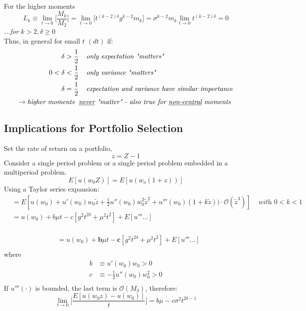 \documentclass[
14pt,notheorems,hyperref={pdfauthor=whatever}
]{beamer}
\begin{document}
\begin{frame}
For the higher moments\\
\[L_k \equiv \lim_{t \to 0}\Bigg[\frac{M_k}{M_2}\Bigg] = \lim_{t \to 0}\Bigg[t^{(k-2)\delta} g^{k-2}m_k\Bigg] = \sigma^{k-2} m_k \lim_{t \to 0} t^{(k-2)\delta}=0\]
\textit{...for $k>2, \delta \geq 0$}\\
\hfill\break
Thus, in general for small $t$ $(dt)$ if:
\begin{align*}
    \delta>\frac{1}{2}& \;\;\;\; \textit{only expectation "matters"}\\
    0<\delta<\frac{1}{2}& \;\;\;\; \textit{only variance "matters"}\\
    \delta=\frac{1}{2}& \;\;\;\; \textit{expectation and variance have similar importance}\\
    \rightarrow \textit{higher moments }\; & \textit{\underline{never} "matter" - also true for \underline{non-central} moments}\\
\end{align*}
\end{frame}

\subsection{Implications for Portfolio Selection}
\begin{frame}
Set the rate of return on a portfolio,\\
\[ z = Z-1\]
Consider a single period problem or a single period problem embedded in a multiperiod problem.
\[E[u(w_0 Z)] = E[u(w_o(1+z))]\]
Using a Taylor series expansion:
\begin{align*}
    &= E[u(w_0)+u'(w_0)w_0 \tilde z + \frac{1}{2}u''(w_0)w_0^2 \tilde z^2 + u'''(w_0)(1+k\tilde z))\cdot \mathcal{O}(\tilde z^3)]\;\;\;\; \textit{with $0<k<1$}\\
    &= u(w_0)+b\mu t -c[g^2t^{2\delta}+\mu^2t^2]+E[u'''...]\\
\end{align*}
\end{frame}

\begin{frame}
\begin{align*}
    &= u(w_0)+\boldsymbol{b}\mu t -\boldsymbol{c}[g^2t^{2\delta}+\mu^2t^2]+E[u'''...]\\
\end{align*}
where
\begin{align*}
    b &\equiv u'(w_0)w_0 >0\\
    c &\equiv -\frac{1}{2}u''(w_0)w_0^2 >0\\
\end{align*}
If $u'''(\cdot)$ is bounded, the last term is $\mathcal{O}(M_3)$, therefore:
\[\lim_{t\to0} \Bigg[\frac{E[u(w_0z)-u(w_0)]}{t}\Bigg] = b\mu-c\sigma^2t^{2\delta-1}\]
\end{frame}
\end{document}

